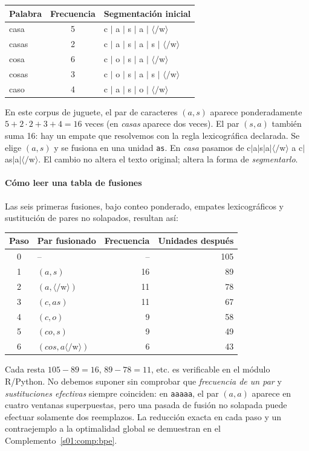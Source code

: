 \begin{center}
\begin{tabular}{lcl}\toprule
Palabra & Frecuencia & Segmentación inicial\\\midrule
casa &5& c $\mid$ a $\mid$ s $\mid$ a $\mid$ $\langle/\mathrm{w}\rangle$\\
casas &2& c $\mid$ a $\mid$ s $\mid$ a $\mid$ s $\mid$ $\langle/\mathrm{w}\rangle$\\
cosa &6& c $\mid$ o $\mid$ s $\mid$ a $\mid$ $\langle/\mathrm{w}\rangle$\\
cosas &3& c $\mid$ o $\mid$ s $\mid$ a $\mid$ s $\mid$ $\langle/\mathrm{w}\rangle$\\
caso &4& c $\mid$ a $\mid$ s $\mid$ o $\mid$ $\langle/\mathrm{w}\rangle$\\\bottomrule
\end{tabular}
\end{center}
\noindent En este corpus de juguete, el par de caracteres $(a,s)$ aparece ponderadamente $5+2\cdot2+3+4=16$ veces (en \emph{casas} aparece dos veces). El par $(s,a)$ también suma 16: hay un empate que resolvemos con la regla lexicográfica declarada. Se elige $(a,s)$ y se fusiona en una unidad \texttt{as}. En \emph{casa} pasamos de c$\mid$a$\mid$s$\mid$a$\mid\langle/\mathrm w\rangle$ a c$\mid$as$\mid$a$\mid\langle/\mathrm w\rangle$. El cambio no altera el texto original; altera la forma de \emph{segmentarlo}.

\paragraph{Cómo leer una tabla de fusiones}
Las seis primeras fusiones, bajo conteo ponderado, empates lexicográficos y sustitución de pares no solapados, resultan así:
\begin{center}
\begin{tabular}{c l r r}\toprule
Paso & Par fusionado & Frecuencia & Unidades después\\\midrule
0 & -- & -- &105\\
1 & $(a,s)$ &16&89\\
2 & $(a,\langle/\mathrm{w}\rangle)$ &11&78\\
3 & $(c,as)$ &11&67\\
4 & $(c,o)$ &9&58\\
5 & $(co,s)$ &9&49\\
6 & $(cos,a\langle/\mathrm{w}\rangle)$ &6&43\\\bottomrule
\end{tabular}
\end{center}
\noindent Cada resta $105-89=16$, $89-78=11$, etc. es verificable en el módulo R/Python. No debemos suponer sin comprobar que \emph{frecuencia de un par} y \emph{sustituciones efectivas} siempre coinciden: en \texttt{aaaaa}, el par $(a,a)$ aparece en cuatro ventanas superpuestas, pero una pasada de fusión no solapada puede efectuar solamente dos reemplazos. La reducción exacta en cada paso y un contraejemplo a la optimalidad global se demuestran en el Complemento~\ref{s01:comp:bpe}.

